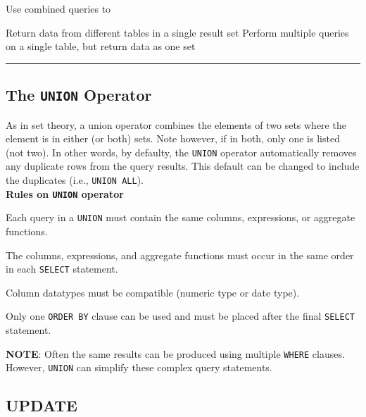 \documentclass{article}
\begin{document}
Use combined queries to
\begin{outline} 
          \1 Return data from different tables in a single result set
          \1 Perform multiple queries on a single table, but return data                 as one set
\end{outline}

  
\hspace{-0.5cm}\rule[-0.101in]{\textwidth}{0.0025in}
  
  
   
\subsection*{The \texttt{UNION} Operator}
  
 As in set theory, a union operator combines the elements of two sets where the element is in either (or both) sets.  Note however, if in both, only one is listed (not two). In other words, by defaulty, the  \texttt{UNION} operator automatically removes any duplicate rows from the query results.  This default can be changed to include the duplicates (i.e., \texttt{UNION  ALL}).      \\


\noindent \textbf{Rules on \texttt{UNION} operator}
\begin{outline}[enumerate]
        \1 Each query in a \texttt{UNION} must contain the same columns, expressions, or aggregate functions.

        \1 The columns, expressions, and aggregate functions must occur in the same order in each \texttt{SELECT} statement.

        \1 Column datatypes must be compatible (numeric type or date type).
        
        \1 Only one \texttt{ORDER BY} clause can be used and must be placed after the final \texttt{SELECT} statement.  
\end{outline}
  
  
\noindent \textbf{NOTE}: Often  the same results can be produced using multiple \texttt{WHERE} clauses.  However, \texttt{UNION} can simplify these complex query statements.   










 
  \subsection*{UPDATE}
  
\end{document}
